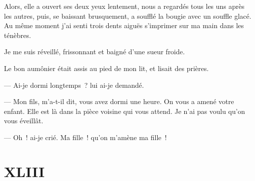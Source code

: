 \documentclass[french,twoside]{book} %
\begin{document}
Alors, elle a ouvert ses deux yeux lentement, nous a regardés tous les uns après les autres, puis, se baissant brusquement, a soufflé la bougie avec un souffle glacé. Au même moment j’ai senti trois dents aiguës s’imprimer sur ma main dans les ténèbres.\par
Je me suis réveillé, frissonnant et baigné d’une sueur froide.\par
Le bon aumônier était assis au pied de mon lit, et lisait des prières.\par
— Ai-je dormi longtemps ? lui ai-je demandé.\par
— Mon fils, m’a-t-il dit, vous avez dormi une heure. On vous a amené votre enfant. Elle est là dans la pièce voisine qui vous attend. Je n’ai pas voulu qu’on vous éveillât.\par
— Oh ! ai-je crié. Ma fille ! qu’on m’amène ma fille !
 \section[{XLIII}]{XLIII}
\label{ch43}\renewcommand{\leftmark}{XLIII}
\end{document}
